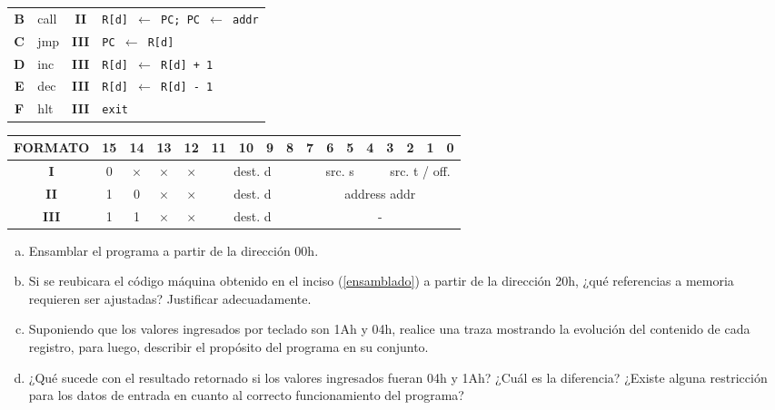 \documentclass[12pt,a4paper]{article}
\begin{document}
\begin{small}
\begin{minipage}{.6\textwidth}
\begin{tabular}{|c|l|c|l|}
			\textbf{B} & \textsf{call}  & \textbf{II} & \texttt{R[d] $\leftarrow$ PC; PC $\leftarrow$ addr} \\
			\textbf{C} & \textsf{jmp}   & \textbf{III} & \texttt{PC $\leftarrow$ R[d]} \\
			\textbf{D} & \textsf{inc}   & \textbf{III} & \texttt{R[d] $\leftarrow$ R[d] + 1} \\
			\textbf{E} & \textsf{dec}   & \textbf{III} & \texttt{R[d] $\leftarrow$ R[d] - 1} \\
			\textbf{F} & \textsf{hlt}   & \textbf{III} & \texttt{exit} \\ \hline
		\end{tabular}	
	\end{minipage}
	\begin{center}
		\begin{tabular}{*{17}{c}}
			\textsf{FORMATO} & 15 & 14 & 13 & 12 & 11 & 10 & 9 & 8 & 7 & 6 & 5 & 4 & 3 & 2 & 1 & 0 \\ \hline
			\multicolumn{1}{|c|}{\textbf{I}} & 0 & $\times$ & $\times$ & $\times$ &
			\multicolumn{4}{|c|}{\textsf{dest. d}} &
			\multicolumn{4}{|c|}{\textsf{src. s}} &
			\multicolumn{4}{|c|}{\textsf{src. t / off.}} \\ \hline
			\multicolumn{1}{|c|}{\textbf{II}} & 1 & 0 & $\times$ & $\times$ &
			\multicolumn{4}{|c|}{\textsf{dest. d}} &
			\multicolumn{8}{|c|}{\textsf{address addr}} \\ \hline
			\multicolumn{1}{|c|}{\textbf{III}} & 1 & 1 & $\times$ & $\times$ &
			\multicolumn{4}{|c|}{\textsf{dest. d}} &
			\multicolumn{8}{|c|}{\textsf{-}} \\ \hline
		\end{tabular}
	\end{center}		
\end{small}

\begin{enumerate}[a)]
	\item Ensamblar el programa a partir de la dirección 00h. \label{ensamblado}
	\item Si se reubicara el código máquina obtenido en el inciso (\ref{ensamblado}) a partir de la dirección 20h, ¿qué referencias a memoria requieren ser ajustadas? Justificar adecuadamente.
	\item Suponiendo que los valores ingresados por teclado son 1Ah y 04h, realice una traza mostrando la evolución del contenido de cada registro, para luego, describir el propósito del programa en su conjunto.
	\item ¿Qué sucede con el resultado retornado si los valores ingresados fueran 04h y 1Ah? ¿Cuál es la diferencia? ¿Existe alguna restricción para los datos de entrada en cuanto al correcto funcionamiento del programa?
\end{enumerate}
\end{document}
